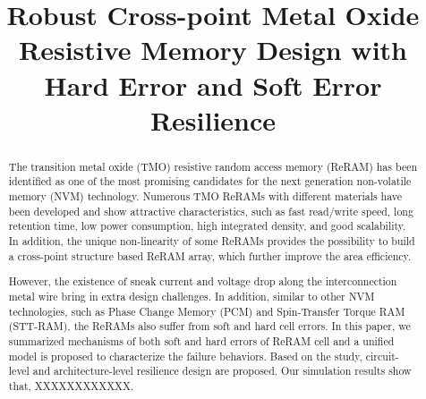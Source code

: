 \documentclass[conference, 9pt]{IEEEtran}
\begin{document}
\title{Robust Cross-point Metal Oxide Resistive Memory Design with Hard Error and Soft Error Resilience }
\maketitle

\begin{abstract}
The transition metal oxide (TMO) resistive random access memory (ReRAM) has been identified as one of the most promising candidates for the next generation non-volatile memory (NVM) technology. Numerous TMO ReRAMs with different materials have been developed and show attractive characteristics, such as fast read/write speed, long retention time, low power consumption, high integrated density, and good scalability. In addition, the unique non-linearity of some ReRAMs provides the possibility to build a cross-point structure based ReRAM array, which further improve the area efficiency.

However, the existence of sneak current and voltage drop along the interconnection metal wire bring in extra design challenges. In addition, similar to other NVM technologies, such as Phase Change Memory (PCM) and Spin-Transfer Torque RAM (STT-RAM), the ReRAMs also suffer from soft and hard cell errors. In this paper, we summarized mechanisms of both soft and hard errors of ReRAM cell and a unified model is proposed to characterize the failure behaviors.  Based on the study, circuit-level and architecture-level resilience design are proposed. Our simulation results show that, XXXXXXXXXXXX.
\end{abstract}









\scriptsize


\end{document}
